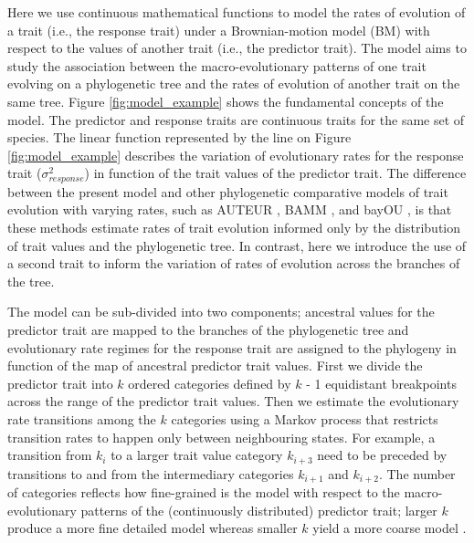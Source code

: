 Here we use continuous mathematical functions to model the rates of evolution of a trait (i.e., the response trait) under a Brownian-motion model (BM) with respect to the values of another trait (i.e., the predictor trait). The model aims to study the association between the macro-evolutionary patterns of one trait evolving on a phylogenetic tree and the rates of evolution of another trait on the same tree. Figure \ref{fig:model_example} shows the fundamental concepts of the model. The predictor and response traits are continuous traits for the same set of species. The linear function represented by the line on Figure \ref{fig:model_example} describes the variation of evolutionary rates for the response trait ($\sigma^{2}_{response}$) in function of the trait values of the predictor trait. The difference between the present model and other phylogenetic comparative models of trait evolution with varying rates, such as AUTEUR \citep{Eastman_2011}, BAMM \citep{rabosky_analysis_2014}, and bayOU \citep{Uyeda_BayOU}, is that these methods estimate rates of trait evolution informed only by the distribution of trait values and the phylogenetic tree. In contrast, here we introduce the use of a second trait to inform the variation of rates of evolution across the branches of the tree.

The model can be sub-divided into two components; ancestral values for the predictor trait are mapped to the branches of the phylogenetic tree and evolutionary rate regimes for the response trait are assigned to the phylogeny in function of the map of ancestral predictor trait values. First we divide the predictor trait into $\mathit{k}$ ordered categories defined by $\mathit{k}$ - 1 equidistant breakpoints across the range of the predictor trait values. Then we estimate the evolutionary rate transitions among the $\mathit{k}$ categories using a Markov process \citep{pagel_detecting_1994} that restricts transition rates to happen only between neighbouring states. For example, a transition from $\mathit{k_{i}}$ to a larger trait value category $\mathit{k_{i+3}}$ need to be preceded by transitions to and from the intermediary categories $\mathit{k_{i+1}}$ and $\mathit{k_{i+2}}$. The number of categories reflects how fine-grained is the model with respect to the macro-evolutionary patterns of the (continuously distributed) predictor trait; larger $\mathit{k}$ produce a more fine detailed model whereas smaller $\mathit{k}$ yield a more coarse model \citep{boucher_inferring_2016}.

